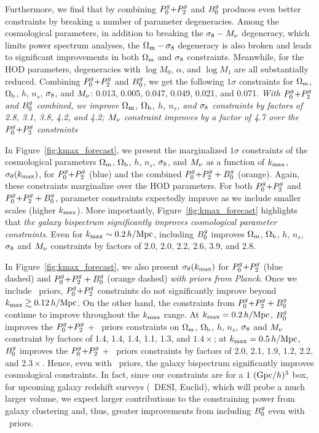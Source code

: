 Furthermore, we find that by combining $P^g_0{+}P^g_2$ and $B^g_0$ produces even better
constraints by breaking a number of parameter degeneracies. Among the cosmological 
parameters, in addition to breaking the $\sigma_8 - M_\nu$ degeneracy, which limits
power spectrum analyses, the $\Omega_{\rm m}-\sigma_8$ degeneracy is also broken and leads to
significant improvements in both $\Omega_{\rm m}$ and 
$\sigma_8$ constraints. Meanwhile, for the HOD parameters, degeneracies with 
$\log M_0$, $\alpha$, and $\log M_1$ are all substantially reduced. 
Combining $P^g_0{+}P^g_2$ and $B^g_0$, we get the following $1\sigma$ constraints for 
 $\Omega_{\rm m}$, $\Omega_{\rm b}$, $h$, $n_s$, $\sigma_8$, and $M_\nu$: 
0.013, 0.005, 0.047, 0.049, 0.021, and 0.071.
{\em With $P^g_0{+}P^g_2$ and $B^g_0$ combined, we improve $\Omega_{\rm m}$, $\Omega_{\rm b}$, $h$,
$n_s$, and $\sigma_8$ constraints by factors of 2.8, 3.1, 3.8, 4.2, and 4.2;
$M_\nu$ constraint improves by a factor of 4.7 over the $P^g_0{+}P^g_2$ constraints}

In Figure~\ref{fig:kmax_forecast}, we present the marginalized $1\sigma$
constraints of the cosmological parameters $\Omega_{\rm m}$, $\Omega_{\rm b}$, $h$, $n_s$, $\sigma_8$, 
and $M_\nu$ as a function of $k_{\rm max}$, $\sigma_\theta(k_{\rm max})$, for $P^g_0{+}P^g_2$
(blue) and the combined $P^g_0{+}P^g_2 + B^g_0$ (orange). Again, these constraints
marginalize over the \cite{zheng2007} HOD parameters. For both $P^g_0{+}P^g_2$ and
$P^g_0{+}P^g_2 + B^g_0$, parameter constraints expectedly improve as
we include smaller scales (higher $k_{\rm max}$). More importantly,
Figure~\ref{fig:kmax_forecast} highlights that {\em the galaxy bispectrum
significantly improves cosmological parameter constraints}. Even for 
$k_{\rm max}\sim 0.2\,h/\mathrm{Mpc}$, including 
$B^g_0$ improves $\Omega_{\rm m}$, $\Omega_{\rm b}$, $h$, $n_s$, $\sigma_8$ and $M_\nu$ constraints by 
factors of 2.0, 2.0, 2.2, 2.6, 3.9, and 2.8.

In Figure~\ref{fig:kmax_forecast}, we also present $\sigma_\theta(k_{\rm max})$ for
$P^g_0{+}P^g_2$ (blue dashed) and $P^g_0{+}P^g_2 + B^g_0$ 
(orange dashed) {\em with priors from Planck}. Once we include \planck~priors,
$P^g_0{+}P^g_2$ constraints do not significantly improve beyond $k_{\rm max} \gtrsim 0.12\,h/\mathrm{Mpc}$.
On the other hand, the constraints from $P^g_0{+}P^g_2 + B^g_0$ continue to improve 
throughout the $k_{\rm max}$ range. 
At $k_{\rm max}=0.2\,h/\mathrm{Mpc}$, $B^g_0$ improves the $P^g_0{+}P^g_2$ + \planck~priors constraints on  
$\Omega_{\rm m}$, $\Omega_{\rm b}$, $h$, $n_s$, $\sigma_8$ and $M_\nu$ constraint by factors of
1.4, 1.4, 1.4, 1.1, 1.3, and $1.4\times$;
at $k_{\rm max} = 0.5\,h/\mathrm{Mpc}$, $B^g_0$ improves the $P^g_0{+}P^g_2$ + \planck~priors constraints 
by factors of 2.0, 2.1, 1.9, 1.2, 2.2, and $2.3\times$. Hence, even with 
\planck~priors, the galaxy bispectrum significantly improves cosmological 
constraints. In fact, since our constraints are for a  $1~({\rm Gpc}/h)^3$ 
box, for upcoming
galaxy redshift surveys (\eg~DESI, Euclid), which will probe a much larger
volume, we expect larger contributions to the constraining power from galaxy 
clustering and, thus, greater improvements from including $B^g_0$ even
with \planck~priors. 

